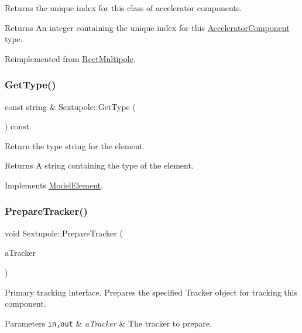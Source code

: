 Returns the unique index for this class of accelerator components. \begin{DoxyReturn}{Returns}
An integer containing the unique index for this \hyperlink{classAcceleratorComponent}{Accelerator\+Component} type. 
\end{DoxyReturn}


Reimplemented from \hyperlink{classRectMultipole_a9bc789b2a193e341aab8bbd47a0e3ad4}{Rect\+Multipole}.

\mbox{\label{classSextupole_a7553de8e94eb0567f0e0b4f74183b8f2}} 
\subsubsection{\texorpdfstring{Get\+Type()}{GetType()}}
{\footnotesize\ttfamily const string \& Sextupole\+::\+Get\+Type (\begin{DoxyParamCaption}{ }\end{DoxyParamCaption}) const\hspace{0.3cm}{\ttfamily [virtual]}}

Return the type string for the element. \begin{DoxyReturn}{Returns}
A string containing the type of the element. 
\end{DoxyReturn}


Implements \hyperlink{classModelElement_a04dc2e51e1999fca612eb1838ec6b271}{Model\+Element}.

\mbox{\label{classSextupole_a7059ddac1812040330950de346e22f48}} 
\subsubsection{\texorpdfstring{Prepare\+Tracker()}{PrepareTracker()}}
{\footnotesize\ttfamily void Sextupole\+::\+Prepare\+Tracker (\begin{DoxyParamCaption}\item[{\hyperlink{classComponentTracker}{Component\+Tracker} \&}]{a\+Tracker }\end{DoxyParamCaption})\hspace{0.3cm}{\ttfamily [virtual]}}

Primary tracking interface. Prepares the specified Tracker object for tracking this component. 
\begin{DoxyParams}[1]{Parameters}
\mbox{\tt in,out}  & {\em a\+Tracker} & The tracker to prepare. \\
\hline
\end{DoxyParams}


